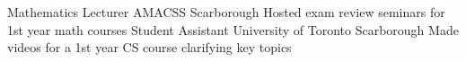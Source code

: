 \begin{cvhonors}
  \cvhonor
    {Mathematics Lecturer}
    {AMACSS}
    {Scarborough}
    {}
    {Hosted exam review seminars for 1st year math courses}
  \cvhonor
    {Student Assistant}
    {University of Toronto}
    {Scarborough}
    {}
    {Made videos for a 1st year CS course clarifying key topics}
\end{cvhonors}
